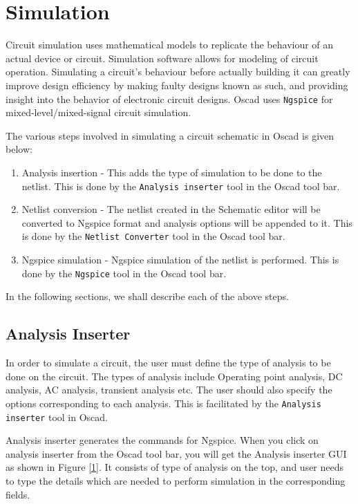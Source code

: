 \chapter{Simulation}
\label{chap6}
Circuit simulation  uses mathematical models to replicate the behaviour of an actual device or circuit. Simulation software allows for modeling of circuit operation. Simulating a circuit's behaviour before actually building it can greatly improve design efficiency by making faulty designs known as such, and providing insight into the behavior of electronic circuit designs. Oscad uses {\tt Ngspice} for mixed-level/mixed-signal circuit simulation. 

The various steps involved in simulating a circuit schematic in Oscad is given below:
\begin{enumerate}
\item Analysis insertion  - This adds the type of simulation to be done to the netlist. This is done by the {\tt Analysis inserter} tool in the Oscad tool bar.
\item Netlist conversion  - The netlist created in the Schematic editor will be converted to Ngspice format and analysis options will be appended to it. This is done by the {\tt Netlist Converter} tool in the Oscad tool bar.
\item Ngspice simulation  - Ngspice simulation of the netlist is performed. This is done by the {\tt Ngspice} tool in the Oscad tool bar.
\end{enumerate}

In the following sections, we shall describe each of the above steps.
\section{Analysis Inserter} 
\label{ana}
In order to simulate a circuit, the user must define the type of analysis to be done on the circuit. The types of analysis  include Operating point analysis, DC analysis, AC analysis, transient analysis etc. The user should also specify the options corresponding to each analysis. This is facilitated by the {\tt Analysis inserter} tool in Oscad.

Analysis inserter generates the commands for Ngspice. When you click on analysis inserter from the Oscad tool bar, you will get the Analysis inserter GUI as shown in Figure \ref{1}. It consists of type of analysis on the top, and user needs to type the details which are needed to perform simulation in the corresponding fields.
